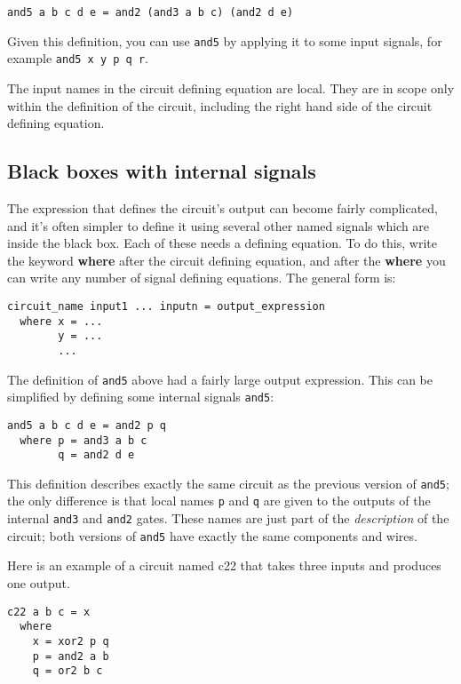 \documentclass[11pt]{article}
\begin{document}
\begin{verbatim}
and5 a b c d e = and2 (and3 a b c) (and2 d e)
\end{verbatim}

Given this definition, you can use \texttt{and5} by applying it to some input
signals, for example \texttt{and5 x y p q r}.

The input names in the circuit defining equation are local.  They are
in scope only within the definition of the circuit, including the
right hand side of the circuit defining equation.

\subsection{Black boxes with internal signals}
\label{sec:orgff92549}

The expression that defines the circuit's output can become fairly
complicated, and it's often simpler to define it using several other
named signals which are inside the black box.  Each of these needs a
defining equation.  To do this, write the keyword \textbf{where} after the
circuit defining equation, and after the \textbf{where} you can write any
number of signal defining equations. The general form is:

\begin{verbatim}
circuit_name input1 ... inputn = output_expression
  where x = ...
        y = ...
        ...
\end{verbatim}

The definition of \texttt{and5} above had a fairly large output expression.
This can be simplified by defining some internal signals \texttt{and5}:

\begin{verbatim}
and5 a b c d e = and2 p q
  where p = and3 a b c
        q = and2 d e
\end{verbatim}

This definition describes exactly the same circuit as the previous
version of \texttt{and5}; the only difference is that local names \texttt{p} and \texttt{q}
are given to the outputs of the internal \texttt{and3} and \texttt{and2} gates.
These names are just part of the \emph{description} of the circuit; both
versions of \texttt{and5} have exactly the same components and wires.

Here is an example of a circuit named c22 that takes three inputs and
produces one output.

\begin{verbatim}
c22 a b c = x
  where
    x = xor2 p q
    p = and2 a b
    q = or2 b c
\end{verbatim}
\end{document}
